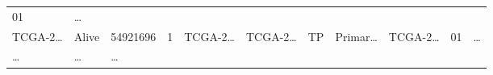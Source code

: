 \documentclass[
]{article}
\begin{document}
\begin{longtable}[]{@{}lllllllllll@{}}
\begin{minipage}[t]{0.10\columnwidth}
01\strut
\end{minipage} & \begin{minipage}[t]{0.03\columnwidth}\raggedright
\ldots{}\strut
\end{minipage}\tabularnewline
\begin{minipage}[t]{0.07\columnwidth}\raggedright
TCGA-2\ldots{}\strut
\end{minipage} & \begin{minipage}[t]{0.04\columnwidth}\raggedright
Alive\strut
\end{minipage} & \begin{minipage}[t]{0.06\columnwidth}\raggedright
54921696\strut
\end{minipage} & \begin{minipage}[t]{0.07\columnwidth}\raggedright
1\strut
\end{minipage} & \begin{minipage}[t]{0.07\columnwidth}\raggedright
TCGA-2\ldots{}\strut
\end{minipage} & \begin{minipage}[t]{0.07\columnwidth}\raggedright
TCGA-2\ldots{}\strut
\end{minipage} & \begin{minipage}[t]{0.07\columnwidth}\raggedright
TP\strut
\end{minipage} & \begin{minipage}[t]{0.07\columnwidth}\raggedright
Primar\ldots{}\strut
\end{minipage} & \begin{minipage}[t]{0.09\columnwidth}\raggedright
TCGA-2\ldots{}\strut
\end{minipage} & \begin{minipage}[t]{0.10\columnwidth}\raggedright
01\strut
\end{minipage} & \begin{minipage}[t]{0.03\columnwidth}\raggedright
\ldots{}\strut
\end{minipage}\tabularnewline
\begin{minipage}[t]{0.07\columnwidth}\raggedright
\ldots{}\strut
\end{minipage} & \begin{minipage}[t]{0.04\columnwidth}\raggedright
\ldots{}\strut
\end{minipage} & \begin{minipage}[t]{0.06\columnwidth}\raggedright
\ldots{}\strut
\end{minipage} & \begin{minipage}[t]{0.07\columnwidth}\raggedright

\end{minipage}
\end{longtable}
\end{document}
